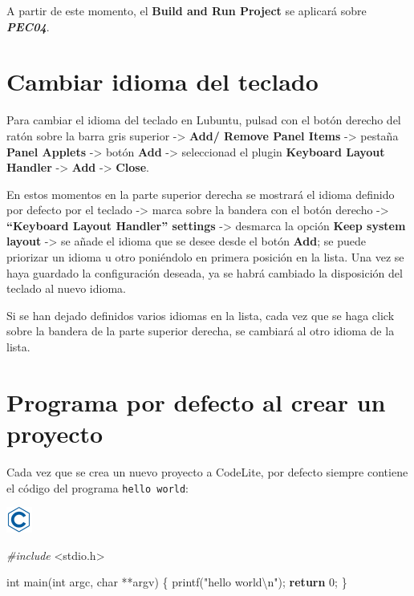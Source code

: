 \documentclass[
]{book}
\newenvironment{Shaded}{\begin{snugshade}}{\end{snugshade}}
\newcommand{\ControlFlowTok}[1]{\textcolor[rgb]{0.13,0.29,0.53}{\textbf{#1}}}
\newcommand{\DataTypeTok}[1]{\textcolor[rgb]{0.13,0.29,0.53}{#1}}
\newcommand{\DecValTok}[1]{\textcolor[rgb]{0.00,0.00,0.81}{#1}}
\newcommand{\ImportTok}[1]{#1}
\newcommand{\NormalTok}[1]{#1}
\newcommand{\PreprocessorTok}[1]{\textcolor[rgb]{0.56,0.35,0.01}{\textit{#1}}}
\newcommand{\SpecialCharTok}[1]{\textcolor[rgb]{0.00,0.00,0.00}{#1}}
\newcommand{\StringTok}[1]{\textcolor[rgb]{0.31,0.60,0.02}{#1}}
\begin{document}
A partir de este momento, el \textbf{Build and Run Project} se aplicará sobre \textbf{\emph{PEC04}}.

\hypertarget{cambiar-idioma-del-teclado}{%
\section{Cambiar idioma del teclado}\label{cambiar-idioma-del-teclado}}

Para cambiar el idioma del teclado en Lubuntu, pulsad con el botón derecho del ratón sobre la barra gris superior -\textgreater{} \textbf{Add/ Remove Panel Items} -\textgreater{} pestaña \textbf{Panel Applets} -\textgreater{} botón \textbf{Add} -\textgreater{} seleccionad el plugin \textbf{Keyboard Layout Handler} -\textgreater{} \textbf{Add} -\textgreater{} \textbf{Close}.

En estos momentos en la parte superior derecha se mostrará el idioma definido por defecto por el teclado -\textgreater{} marca sobre la bandera con el botón derecho -\textgreater{} \textbf{``Keyboard Layout Handler'' settings} -\textgreater{} desmarca la opción \textbf{Keep system layout} -\textgreater{} se añade el idioma que se desee desde el botón \textbf{Add}; se puede priorizar un idioma u otro poniéndolo en primera posición en la lista. Una vez se haya guardado la configuración deseada, ya se habrá cambiado la disposición del teclado al nuevo idioma.

Si se han dejado definidos varios idiomas en la lista, cada vez que se haga click sobre la bandera de la parte superior derecha, se cambiará al otro idioma de la lista.

\hypertarget{programa-por-defecto-al-crear-un-proyecto}{%
\section{Programa por defecto al crear un proyecto}\label{programa-por-defecto-al-crear-un-proyecto}}

Cada vez que se crea un nuevo proyecto a CodeLite, por defecto siempre contiene el código del programa \texttt{hello\ world}:

\includegraphics{./img/c.png}

\begin{Shaded}
\begin{Highlighting}[]
\PreprocessorTok{\#include }\ImportTok{\textless{}stdio.h\textgreater{}}

\DataTypeTok{int}\NormalTok{ main(}\DataTypeTok{int}\NormalTok{ argc, }\DataTypeTok{char}\NormalTok{ **argv)}
\NormalTok{\{}
\NormalTok{    printf(}\StringTok{"hello world}\SpecialCharTok{\textbackslash{}n}\StringTok{"}\NormalTok{);}
    \ControlFlowTok{return} \DecValTok{0}\NormalTok{;}
\NormalTok{\}}
\end{Highlighting}
\end{Shaded}
\end{document}
